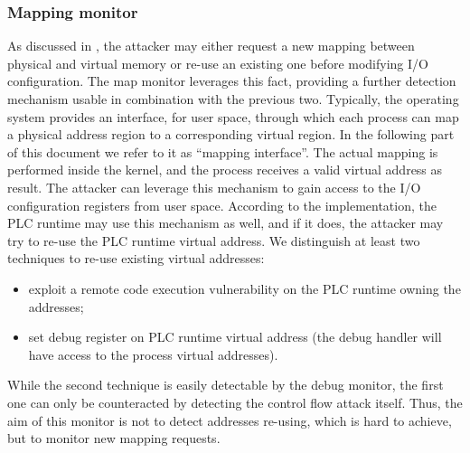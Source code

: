 \subsubsection{Mapping monitor}

As discussed in , the attacker may either request a new mapping between physical and virtual memory or re-use an existing one before
modifying I/O configuration. The map monitor leverages this fact, providing a further detection mechanism usable in combination with the previous two.
Typically, the operating system provides an interface, for user space, through which each process can map a physical address region to a corresponding virtual region.
In the following part of this document we refer to it as ``mapping interface''.
The actual mapping is performed inside the kernel, and the process receives a valid virtual address as result.
The attacker can leverage this mechanism to gain access to the I/O configuration registers from user space.
According to the implementation, the PLC runtime may use this mechanism as well, and if it does, the attacker may try to re-use the PLC runtime virtual address.
We distinguish at least two techniques to re-use existing virtual addresses:
\begin{itemize}
	\item exploit a remote code execution vulnerability on the PLC runtime owning the addresses;
	\item set debug register on PLC runtime virtual address (the debug handler will have access to the process virtual addresses).
\end{itemize}
While the second technique is easily detectable by the debug monitor, the first one can only be counteracted by detecting the control flow attack itself.
Thus, the aim of this monitor is not to detect addresses re-using, which is hard to achieve, but to monitor new mapping requests.

